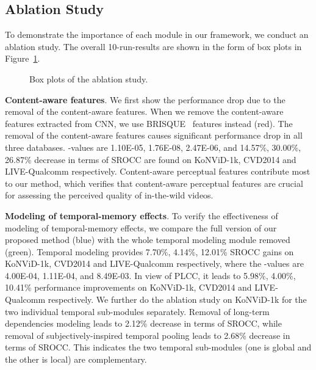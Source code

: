 \documentclass[sigconf]{acmart}
\begin{document}
\subsection{Ablation Study}
\label{sec:ablation}

To demonstrate the importance of each module in our framework, we conduct an ablation study. The overall 10-run-results are shown in the form of box plots in Figure~\ref{fig:ablation}.

\begin{figure}[!htb]
\begin{center}
\hfil
\hfil
\end{center}
   \caption{Box plots of the ablation study.}
\label{fig:ablation}
\end{figure}



\textbf{Content-aware features}. We first show the performance drop due to the removal of the content-aware features. When we remove the content-aware features extracted from CNN, we use BRISQUE~\cite{mittal2012no} features instead ({\color[RGB]{179,87,81}red}). The removal of the content-aware features causes significant performance drop in all three databases. -values are 1.10E-05, 1.76E-08, 2.47E-06, and 14.57\%, 30.00\%, 26.87\% decrease in terms of SROCC are found on KoNViD-1k, CVD2014 and LIVE-Qualcomm respectively. Content-aware perceptual features contribute most to our method, which verifies that content-aware perceptual features are crucial for assessing the perceived quality of in-the-wild videos. 


\textbf{Modeling of temporal-memory effects}. To verify the effectiveness of modeling of temporal-memory effects, we compare the full version of our proposed method ({\color[RGB]{100,170,195}blue}) with the whole temporal modeling module removed ({\color[RGB]{162,185,102}green}). Temporal modeling provides 7.70\%, 4.14\%, 12.01\% SROCC gains on KoNViD-1k, CVD2014 and LIVE-Qualcomm respectively, where the -values are 4.00E-04, 1.11E-04, and 8.49E-03. In view of PLCC, it leads to 5.98\%, 4.00\%, 10.41\% performance improvements on KoNViD-1k, CVD2014 and LIVE-Qualcomm respectively. We further do the ablation study on KoNViD-1k for the two individual temporal sub-modules separately. Removal of long-term dependencies modeling leads to 2.12\% decrease in terms of SROCC, while removal of subjectively-inspired temporal pooling leads to 2.68\% decrease in terms of SROCC. This indicates the two temporal sub-modules (one is global and the other is local) are complementary.
\end{document}
